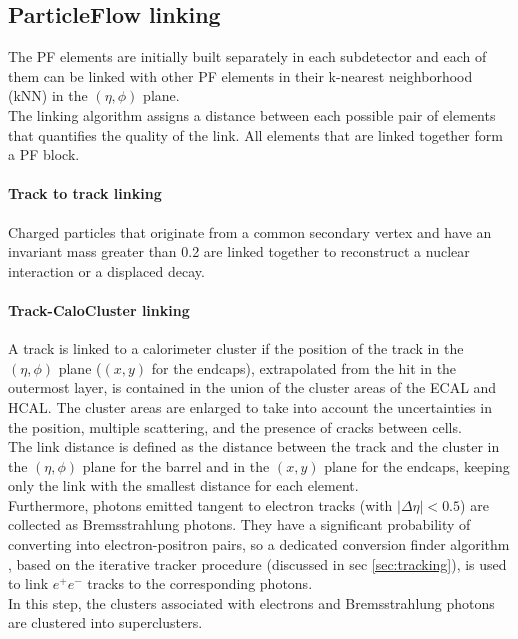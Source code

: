 \subsection{ParticleFlow linking}
The PF elements are initially built separately in each subdetector and each of them can be linked with other PF elements in their k-nearest neighborhood \cite{Dasarathy1991NearestTechniques} (kNN) in the $(\eta,\phi)$ plane.\\
The linking algorithm assigns a distance between each possible pair of elements that quantifies the quality of the link. All elements that are linked together form a PF block.\\

\paragraph*{Track to track linking}
Charged particles that originate from a common secondary vertex and have an invariant mass greater than 0.2 \GeV are linked together to reconstruct a nuclear interaction or a displaced decay.

\paragraph*{Track-CaloCluster linking}
A track is linked to a calorimeter cluster if the position of the track in the $(\eta,\phi)$ plane ($(x,y)$ for the endcaps), extrapolated from the hit in the outermost layer, is contained in the union of the cluster areas of the ECAL and HCAL. The cluster areas are enlarged to take into account the uncertainties in the position, multiple scattering, and the presence of cracks between cells.\\
The link distance is defined as the distance between the track and the cluster in the $(\eta,\phi)$ plane for the barrel and in the $(x,y)$ plane for the endcaps, keeping only the link with the smallest distance for each element.\\
Furthermore, photons emitted tangent to electron tracks (with $|\Delta \eta| <0.5$) are collected as Bremsstrahlung photons. They have a significant probability of converting into electron-positron pairs, so a dedicated conversion finder algorithm \cite{Sirunyan2021ElectronLHC}, based on the iterative tracker procedure (discussed in sec \ref{sec:tracking}), is used to link $e^+e^-$ tracks to the corresponding photons.\\
In this step, the clusters associated with electrons and Bremsstrahlung photons are clustered into superclusters.



